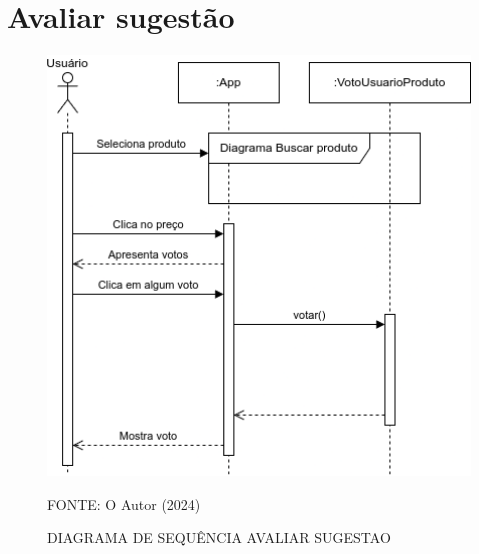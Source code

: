 \section{Avaliar sugestão}
\begin{figure}[H]
    \caption{\label{fig:label} DIAGRAMA DE SEQUÊNCIA AVALIAR SUGESTAO}
    \includegraphics[width = 150mm]{fig/sequencia/sequencia3.png}
    \footnotesize \centering
    \par FONTE: O Autor (2024)
\end{figure}


